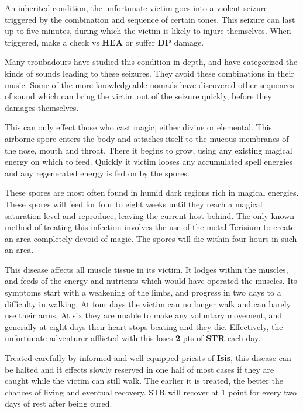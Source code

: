 \begin{multicols*}{2}
 An inherited condition, the unfortunate victim goes into a violent seizure triggered by the combination and sequence of certain tones. This seizure can last up to five minutes, during which the victim is likely to injure themselves. When triggered, make a  check vs \textbf{HEA} or suffer  \textbf{DP} damage.

Many troubadours have studied this condition in depth, and have categorized the kinds of sounds leading to these seizures. They avoid these combinations in their music. Some of the more knowledgeable nomads have discovered other sequences of sound which can bring the victim out of the seizure quickly, before they damages themselves.

 This can only effect those who cast magic, either divine or elemental. This airborne spore enters the body and attaches itself to the mucous membranes of the nose, mouth and throat. There it begins to grow, using any existing magical energy on which to feed. Quickly it victim looses any accumulated spell energies and any regenerated energy is fed on by the spores.

These spores are most often found in humid dark regions rich in magical energies. These spores will feed for four to eight weeks until they reach a magical saturation level and reproduce, leaving the current host behind. The only known method of treating this infection involves the use of the metal Terisium to create an area completely devoid of
magic. The spores will die within four hours in such an area.

 This disease affects all muscle tissue in its victim. It lodges within the muscles, and feeds of the energy and nutrients which would have operated the muscles. Its symptoms start with a weakening of the limbs, and progress in two days to a difficulty in walking. At four days the victim can no longer walk and can barely use their arms. At six they are unable to make any voluntary movement, and generally at eight days their heart stops beating and they die. Effectively, the unfortunate adventurer afflicted with this loses \textbf{2} pts of \textbf{STR} each day.

Treated carefully by informed and well equipped priests of \textbf{Isis}, this disease can be halted and it effects slowly reserved in one half of most cases if they are caught while the victim can still walk. The earlier it is treated, the better the chances of living and eventual recovery. STR will recover at 1 point for every two days of rest after being cured.


\end{multicols*}
